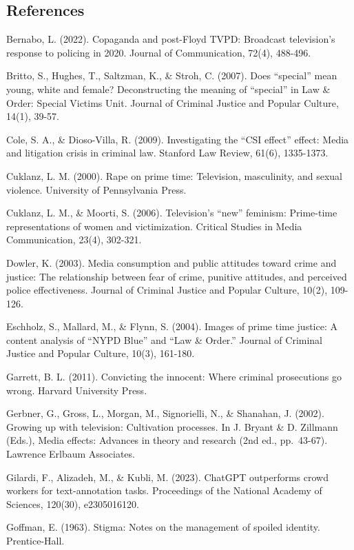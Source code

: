 \documentclass[
]{article}
\begin{document}
\subsection{References}\label{references}

Bernabo, L. (2022). Copaganda and post-Floyd TVPD: Broadcast
television's response to policing in 2020. Journal of Communication,
72(4), 488-496.

Britto, S., Hughes, T., Saltzman, K., \& Stroh, C. (2007). Does
``special'' mean young, white and female? Deconstructing the meaning of
``special'' in Law \& Order: Special Victims Unit. Journal of Criminal
Justice and Popular Culture, 14(1), 39-57.

Cole, S. A., \& Dioso-Villa, R. (2009). Investigating the ``CSI effect''
effect: Media and litigation crisis in criminal law. Stanford Law
Review, 61(6), 1335-1373.

Cuklanz, L. M. (2000). Rape on prime time: Television, masculinity, and
sexual violence. University of Pennsylvania Press.

Cuklanz, L. M., \& Moorti, S. (2006). Television's ``new'' feminism:
Prime-time representations of women and victimization. Critical Studies
in Media Communication, 23(4), 302-321.

Dowler, K. (2003). Media consumption and public attitudes toward crime
and justice: The relationship between fear of crime, punitive attitudes,
and perceived police effectiveness. Journal of Criminal Justice and
Popular Culture, 10(2), 109-126.

Eschholz, S., Mallard, M., \& Flynn, S. (2004). Images of prime time
justice: A content analysis of ``NYPD Blue'' and ``Law \& Order.''
Journal of Criminal Justice and Popular Culture, 10(3), 161-180.

Garrett, B. L. (2011). Convicting the innocent: Where criminal
prosecutions go wrong. Harvard University Press.

Gerbner, G., Gross, L., Morgan, M., Signorielli, N., \& Shanahan, J.
(2002). Growing up with television: Cultivation processes. In J. Bryant
\& D. Zillmann (Eds.), Media effects: Advances in theory and research
(2nd ed., pp.~43-67). Lawrence Erlbaum Associates.

Gilardi, F., Alizadeh, M., \& Kubli, M. (2023). ChatGPT outperforms
crowd workers for text-annotation tasks. Proceedings of the National
Academy of Sciences, 120(30), e2305016120.

Goffman, E. (1963). Stigma: Notes on the management of spoiled identity.
Prentice-Hall.
\end{document}
